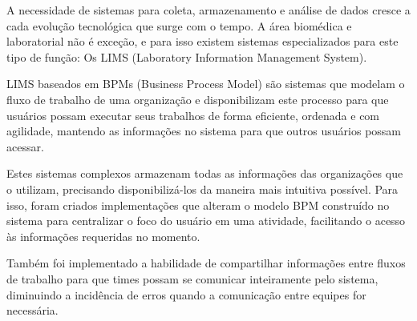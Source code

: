 A necessidade de sistemas para coleta, armazenamento e análise de dados cresce a cada evolução tecnológica que surge com o tempo. A área biomédica e laboratorial não é exceção, e para isso existem sistemas especializados para este tipo de função: Os LIMS (Laboratory Information Management System).

LIMS baseados em BPMs (Business Process Model) são sistemas que modelam o fluxo de trabalho de uma organização e disponibilizam este processo para que usuários possam executar seus trabalhos de forma eficiente, ordenada e com agilidade, mantendo as informações no sistema para que outros usuários possam acessar.

Estes sistemas complexos armazenam todas as informações das organizações que o utilizam, precisando disponibilizá-los da maneira mais intuitiva possível. Para isso, foram criados implementações que alteram o modelo BPM construído no sistema para centralizar o foco do usuário em uma atividade, facilitando o acesso às informações requeridas no momento.

Também foi implementado a habilidade de compartilhar informações entre fluxos de trabalho para que times possam se comunicar inteiramente pelo sistema, diminuindo a incidência de erros quando a comunicação entre equipes for necessária.